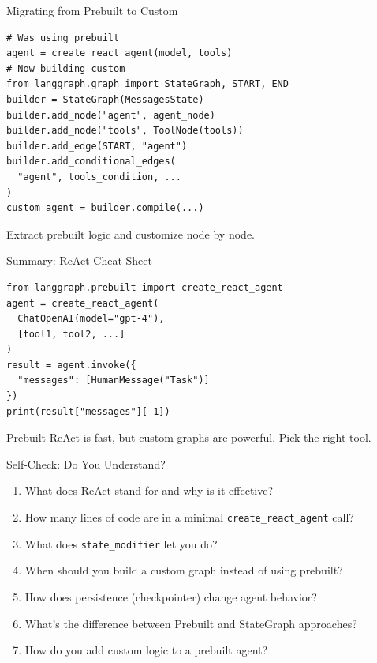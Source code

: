 \documentclass[aspectratio=169,11pt]{beamer}
\begin{document}
\begin{frame}[fragile]{Migrating from Prebuilt to Custom}
  \begin{codebox}
    \begin{lstlisting}
# Was using prebuilt
agent = create_react_agent(model, tools)
# Now building custom
from langgraph.graph import StateGraph, START, END
builder = StateGraph(MessagesState)
builder.add_node("agent", agent_node)
builder.add_node("tools", ToolNode(tools))
builder.add_edge(START, "agent")
builder.add_conditional_edges(
  "agent", tools_condition, ...
)
custom_agent = builder.compile(...)
    \end{lstlisting}
  \end{codebox}
  \vspace{0.1cm}
  \begin{tipbox}
    Extract prebuilt logic and customize node by node.
  \end{tipbox}
\end{frame}

\begin{frame}[fragile]{Summary: ReAct Cheat Sheet}
  \begin{codebox}
    \begin{lstlisting}
from langgraph.prebuilt import create_react_agent
agent = create_react_agent(
  ChatOpenAI(model="gpt-4"),
  [tool1, tool2, ...]
)
result = agent.invoke({
  "messages": [HumanMessage("Task")]
})
print(result["messages"][-1])
    \end{lstlisting}
  \end{codebox}
  \vspace{0.1cm}
  \begin{tipbox}[Remember]
    Prebuilt ReAct is fast, but custom graphs are powerful. Pick the right tool.
  \end{tipbox}
\end{frame}

\begin{frame}{Self-Check: Do You Understand?}
  \begin{enumerate}
    \setlength{\itemsep}{1pt}
    \item What does ReAct stand for and why is it effective?
    \item How many lines of code are in a minimal \texttt{create\_react\_agent} call?
    \item What does \texttt{state\_modifier} let you do?
    \item When should you build a custom graph instead of using prebuilt?
    \item How does persistence (checkpointer) change agent behavior?
    \item What's the difference between Prebuilt and StateGraph approaches?
    \item How do you add custom logic to a prebuilt agent?
  \end{enumerate}
\end{frame}
\end{document}
